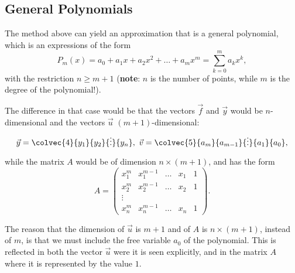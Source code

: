 \subsection{General Polynomials}
The method above can yield an approximation that is a general polynomial, which is an expressions of the form
\begin{equation*}
  P_{m}(x) = a_{0} + a_{1}x + a_{2}x^{2} + \dots + a_{m}x^{m} = \sum_{k=0}^{m}a_{k}x^{k},
\end{equation*}
with the restriction $n \geq m+1$ (\textbf{note}: $n$ is the number of points, while $m$ is the degree of the polynomial!).

The difference in that case would be that the vectors $\vec{f}$ and $\vec{y}$ would be $n$-dimensional and the vectors $\vec{u}$ $(m+1)$-dimensional:
\begin{equation*}
  \vec{y} = \colvec{4}{y_{1}}{y_{2}}{\vdots}{y_{n}},\ \vec{v} = \colvec{5}{a_{m}}{a_{m-1}}{\vdots}{a_{1}}{a_{0}},
\end{equation*}

while the matrix $A$ would be of dimension $n\times (m+1)$, and has the form
\begin{equation*}
  A = \begin{pmatrix} x_{1}^{m} & x_{1}^{m-1} & \dots & x_{1} & 1 \\ x_{2}^{m} & x_{2}^{m-1} & \dots & x_{2} & 1 \\ \vdots \\ x_{n}^{m} & x_{n}^{m-1} & \dots & x_{n} & 1 \end{pmatrix}.
\end{equation*}

\begin{warning}
  The reason that the dimension of $\vec{u}$ is $m+1$ and of $A$ is $n\times(m+1)$, instead of $m$, is that we must include the free variable $a_{0}$ of the polynomial. This is reflected in both the vector $\vec{u}$ were it is seen explicitly, and in the matrix $A$ where it is represented by the value $1$.
\end{warning}

